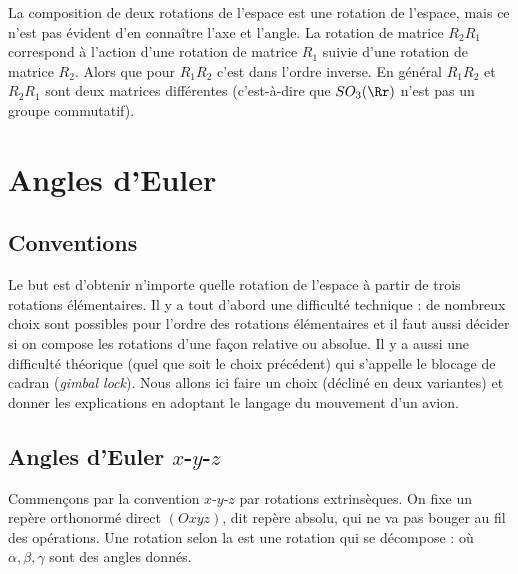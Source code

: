 \documentclass[11pt,class=report,crop=false]{standalone}
\begin{document}
La composition de deux rotations de l'espace est une rotation de l'espace, mais ce n'est pas évident d'en connaître l'axe et l'angle.
La rotation de matrice $R_2 R_1$ correspond à l'action d'une rotation de matrice $R_1$ suivie d'une rotation de matrice $R_2$. 
Alors que pour $R_1R_2$ c'est dans l'ordre inverse.
En général $R_1R_2$ et $R_2R_1$ sont deux matrices différentes (c'est-à-dire que $SO_3(\Rr)$ n'est pas un groupe commutatif).



\section{Angles d'Euler}

\subsection{Conventions}

Le but est d'obtenir n'importe quelle rotation de l'espace à partir de trois rotations élémentaires.
Il y a tout d'abord une difficulté technique : de nombreux choix sont possibles pour l'ordre des rotations élémentaires et il faut aussi décider si on compose les rotations d'une façon relative ou absolue. Il y a aussi une difficulté théorique (quel que soit le choix précédent) qui s'appelle le \og{}blocage de cadran\fg{} (\emph{gimbal lock}).   
Nous allons ici faire un choix (décliné en deux variantes) et donner les explications en adoptant le langage du mouvement d'un avion.

\subsection{Angles d'Euler $x$-$y$-$z$}
\label{ssec:eulerxyz}


Commençons par la convention $x$-$y$-$z$ par rotations extrinsèques.
On fixe un repère orthonormé direct $(Oxyz)$, dit repère absolu, qui ne va pas bouger au fil des opérations.
Une rotation selon la  est une rotation qui se décompose :
où $\alpha, \beta, \gamma$ sont des angles donnés.

\end{document}
